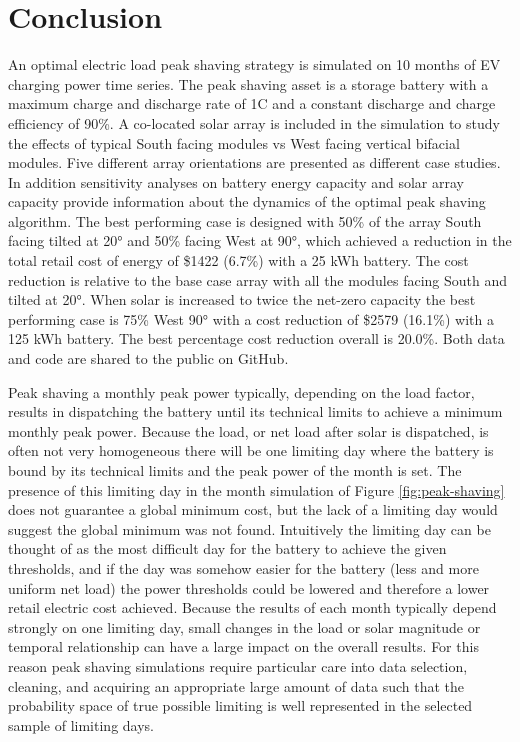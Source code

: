 \documentclass[
]{article}
\begin{document}
\hypertarget{conclusion}{%
  \section{Conclusion}\label{conclusion}}

An optimal electric load peak shaving strategy is simulated on 10 months
of EV charging power time series. The peak shaving asset is a storage
battery with a maximum charge and discharge rate of 1C and a constant
discharge and charge efficiency of 90\%. A co-located solar array is
included in the simulation to study the effects of typical South facing
modules vs West facing vertical bifacial modules. Five different array
orientations are presented as different case studies. In addition
sensitivity analyses on battery energy capacity and solar array capacity
provide information about the dynamics of the optimal peak shaving
algorithm. The best performing case is designed with 50\% of the array
South facing tilted at 20° and 50\% facing West at 90°, which achieved a
reduction in the total retail cost of energy of \$1422 (6.7\%) with a 25
kWh battery. The cost reduction is relative to the base case array with
all the modules facing South and tilted at 20°. When solar is increased
to twice the net-zero capacity the best performing case is 75\% West 90°
with a cost reduction of \$2579 (16.1\%) with a 125 kWh battery. The
best percentage cost reduction overall is 20.0\%. Both data and code are
shared to the public on GitHub.

Peak shaving a monthly peak power typically, depending on the load
factor, results in dispatching the battery until its technical limits to
achieve a minimum monthly peak power. Because the load, or net load
after solar is dispatched, is often not very homogeneous there will be
one limiting day where the battery is bound by its technical limits and
the peak power of the month is set. The presence of this limiting day in
the month simulation of Figure \ref{fig:peak-shaving} does not guarantee a global minimum
cost, but the lack of a limiting day would suggest the global minimum
was not found. Intuitively the limiting day can be thought of as the
most difficult day for the battery to achieve the given thresholds, and
if the day was somehow easier for the battery (less and more uniform net
load) the power thresholds could be lowered and therefore a lower retail
electric cost achieved. Because the results of each month typically
depend strongly on one limiting day, small changes in the load or solar
magnitude or temporal relationship can have a large impact on the
overall results. For this reason peak shaving simulations require
particular care into data selection, cleaning, and acquiring an
appropriate large amount of data such that the probability space of true
possible limiting is well represented in the selected sample of limiting
days.
\end{document}

